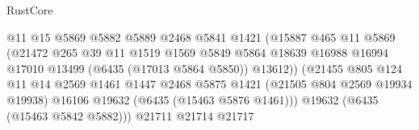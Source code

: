 \begin{lexlean}{RustCore}
\begin{coremodule}
                                              @11
                                              @15
                                              @5869
                                              @5882
                                              @5889
                                              @2468
                                              @5841
                                              @1421
                                              (@15887
                                                @465
                                                @11
                                                @5869
                                                (@21472
                                                  @265
                                                  @39
                                                  @11
                                                  @1519
                                                  @1569
                                                  @5849
                                                  @5864
                                                  @18639
                                                  @16988
                                                  @16994
                                                  @17010
                                                  @13499
                                                  (@6435 (@17013 @5864 @5850))
                                                  @13612))
                                              (@21455
                                                @805
                                                @124
                                                @11
                                                @14
                                                @2569
                                                @1461
                                                @1447
                                                @2468
                                                @5875
                                                @1421
                                                (@21505 @804 @2569 @19934 @19938)
                                                @16106
                                                @19632
                                                (@6435 (@15463 @5876 @1461)))
                                              @19632
                                              (@6435 (@15463 @5842 @5882)))
                                            @21711
                                            @21714
                                            @21717

\end{coremodule}
\end{lexlean}
